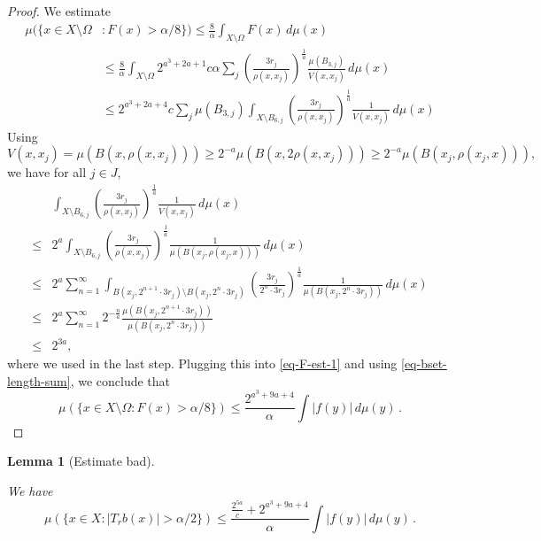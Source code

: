 \documentclass[10pt,a4paper]{article}
\theoremstyle{plain}
\newtheorem{lemma}[theorem]{Lemma}
\theoremstyle{definition}
\numberwithin{equation}{subsection}
\newcommand{\lean}[1]{}
\newcommand{\uses}[1]{}
\newcommand{\leanok}{}
\begin{document}
\begin{proof}
    \leanok
    We estimate
    \begin{align}
        \mu(\{x\in X\setminus\Omega&: F(x)> \alpha/8\})
        \le \frac{8}{\alpha} \int_{X\setminus \Omega} F(x)\,d\mu(x) \\
        &\le \frac{8}{\alpha} \int_{X\setminus \Omega} 2^{a^3+2a+1} c\alpha \sum_{j} \left(\frac{3r_j}{\rho(x,x_j)}\right)^{\frac{1}{a}}\frac{\mu(B_{3,j})}{V(x,x_j)}\,d\mu(x) \\
        \label{eq-F-est-1}
        &\le 2^{a^3+2a+4} c \sum_{j} \mu(B_{3,j}) \int_{X\setminus B_{6,j}} \left(\frac{3r_j}{\rho(x,x_j)}\right)^{\frac{1}{a}}\frac{1}{V(x,x_j)}\,d\mu(x)
    \end{align}
    Using
    \begin{equation*}
        V(x,x_j) = \mu(B(x,\rho(x,x_j))) \ge 2^{-a}\mu(B(x,2\rho(x,x_j))) \ge 2^{-a} \mu(B(x_j,\rho(x_j,x))),
    \end{equation*}
    we have for all $j\in J$,
    \begin{align*}
        &\int_{X\setminus B_{6,j}} \left(\frac{3r_j}{\rho(x,x_j)}\right)^{\frac{1}{a}}\frac{1}{V(x,x_j)}\,d\mu(x) \\
        \le& 2^a \int_{X\setminus B_{6,j}} \left(\frac{3r_j}{\rho(x,x_j)}\right)^{\frac{1}{a}}\frac{1}{\mu(B(x_j,\rho(x_j,x)))}\,d\mu(x) \\
        \le&2^a \sum_{n=1}^\infty \int_{B(x_j,2^{n+1}\cdot3r_j)\setminus B(x_j,2^n\cdot3r_j)} \left(\frac{3r_j}{2^n \cdot3r_j}\right)^{\frac{1}{a}}\frac{1}{\mu(B(x_j,2^n \cdot3r_j))}\,d\mu(x) \\
        \le&2^a \sum_{n=1}^\infty 2^{-\frac{n}{a}} \frac{\mu(B(x_j,2^{n+1}\cdot3r_j))}{\mu(B(x_j,2^n \cdot3r_j))} \\
        \le&2^{3a},
    \end{align*}
    where we used  in the last step.
    Plugging this into \eqref{eq-F-est-1} and using \eqref{eq-bset-length-sum}, we conclude that
    \begin{equation*}
        \mu(\{x\in X\setminus\Omega: F(x)> \alpha/8\}) \le \frac{2^{a^3+9a+4}}{\alpha} \int |f(y)|\,d\mu(y)\,.
    \end{equation*}
\end{proof}


\begin{lemma}[Estimate bad]
    \label{estimate-bad}
    \leanok
    \lean{estimate_bad}
    \uses{Calderon-Zygmund-decomposition,estimate-bad-partial,estimate-F-set}
    We have
    \begin{equation*}
        \mu\left({\{x\in X: |T_r b(x)|>\alpha/2\}}\right) \le  \frac{\frac{2^{5a}}{c} + 2^{a^3+9a+4}}{\alpha} \int |f(y)|\,d\mu(y) \,.
    \end{equation*}
\end{lemma}
\end{document}
